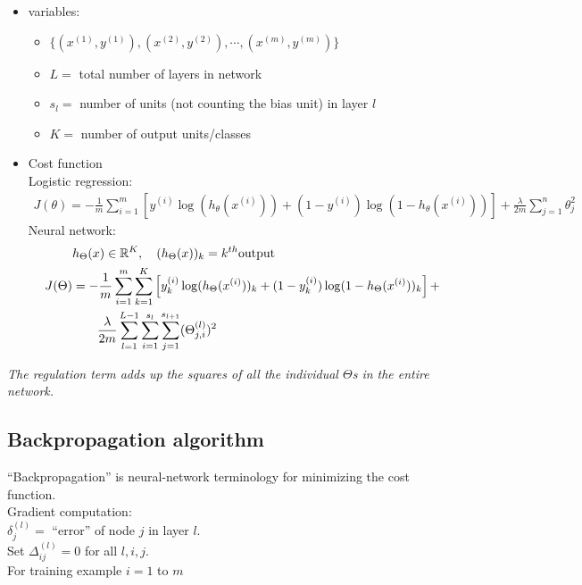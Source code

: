 \begin{itemize}
\item
variables:
    \begin{itemize}
        \item
        $\{(x^{(1)}, y^{(1)}), (x^{(2)}, y^{(2)}), \cdots, (x^{(m)}, y^{(m)})\}$
        \item
        $L = $ total number of layers in network
        \item
        $s_l = $ number of units (not counting the bias unit) in layer $l$
        \item
        $K = $ number of output units/classes
    \end{itemize}
\item
Cost function\\
Logistic regression:\\
   \begin{align*} 
        J(\theta) = -\frac{1}{m}\sum_{i=1}^m \left[ y^{(i)}\log(h_\theta(x^{(i)})) + (1-y^{(i)})\log(1- h_\theta(x^{(i)})) \right] + \frac{\lambda}{2m}\sum_{j=1}^n\theta_j^2
    \end{align*}
Neural network:\\
   \begin{align} 
   & h_\Theta(x) \in \mathbb{R}^K, \quad  (h_\Theta(x))_k = k^{th} \text{output } \nonumber \\
        J(\Theta) &= -\frac{1}{m} \sum_{i=1}^m\sum_{k=1}^{K} \left[ y_k^{(i)}\log(h_\Theta(x^{(i)}))_k + (1-y^{(i)}_k)\log(1- h_\Theta(x^{(i)}))_k \right] + \notag \\ &\qquad
         \frac{\lambda}{2m}\sum_{l=1}^{L-1}\sum_{i=1}^{s_l}\sum_{j=1}^{s_{l+1}}(\Theta_{j,i}^{(l)})^2
    \end{align}
\end{itemize}

\emph{\textcolor{Bittersweet}{The regulation term adds up the squares of all the individual $\Theta$s in the entire network.}}

%
\subsection{Backpropagation algorithm}
``Backpropagation'' is neural-network terminology for minimizing the cost function.\\
Gradient computation:\\
$\delta_j^{(l)} = $ ``error'' of node $j$ in layer $l$.\\
\newline
Set $\Delta_{ij}^{(l)} = 0$ for all $l, i, j$.\\
For training example $i = 1$ to $m$

